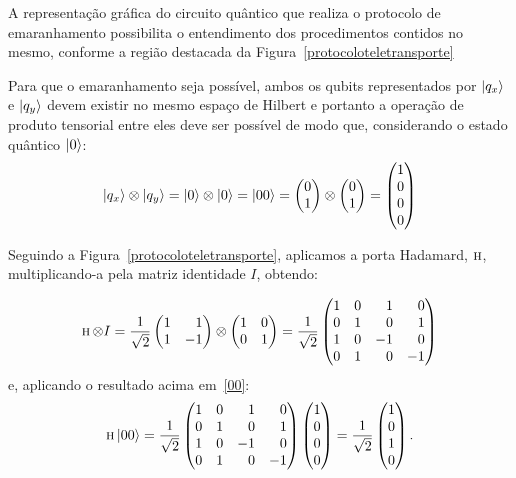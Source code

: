A representação gráfica do circuito quântico que realiza o protocolo de emaranhamento possibilita o entendimento dos procedimentos contidos no mesmo, conforme a região destacada da Figura~\ref{protocoloteletransporte}

Para que o emaranhamento seja possível, ambos os qubits representados por $\ket{q_x}$ e $\ket{q_y}$ devem existir no mesmo espaço de Hilbert e portanto a operação de produto tensorial entre eles deve ser possível de modo que, considerando o estado quântico $\ket{0}$:
\begin{equation}
\ket{q_x} \otimes \ket{q_y} = \ket{0} \otimes \ket{0} = \ket{00} = \begin{pmatrix}
0 \\
1
\end{pmatrix} \otimes \begin{pmatrix}
0 \\
1
\end{pmatrix} = \begin{pmatrix}
1 \\
0 \\
0 \\
0
\end{pmatrix}
\end{equation}

Seguindo a Figura~\ref{protocoloteletransporte}, aplicamos a porta Hadamard, \(\operatorname{\textsc{h}}\), multiplicando-a pela matriz identidade \(I\), obtendo:

\begin{equation}
\HAD \otimes I = \frac{1}{\sqrt{2}} \begin{pmatrix*}[r]
1 & 1 \\
1 & -1
\end{pmatrix*} \otimes \begin{pmatrix}
1 & 0 \\
0 & 1
\end{pmatrix} = \frac{1}{\sqrt{2}} \begin{pmatrix*}[r]
1 & 0 & 1 & 0 \\
0 & 1 & 0 & 1 \\
1 & 0 & -1 & 0 \\
0 & 1 & 0 & -1
\end{pmatrix*}
\end{equation}
e, aplicando o resultado acima em~\eqref{00}:
\begin{equation}
\HAD \ket{00} = \frac{1}{\sqrt{2}} \begin{pmatrix*}[r]
1 & 0 & 1 & 0 \\
0 & 1 & 0 & 1 \\
1 & 0 & -1 & 0 \\
0 & 1 & 0 & -1
\end{pmatrix*} \begin{pmatrix}
1 \\
0 \\
0 \\
0
\end{pmatrix} = \frac{1}{\sqrt{2}} \begin{pmatrix}
1 \\
0 \\
1 \\
0
\end{pmatrix}.
\end{equation}

